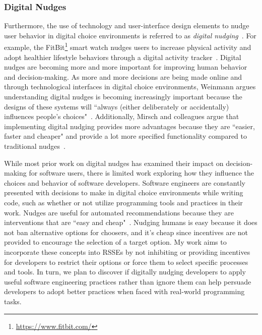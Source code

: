 \subsubsection{Digital Nudges}

Furthermore, the use of technology and user-interface design elements to nudge user behavior in digital choice environments is referred to as \textit{digital nudging}~\cite{weinmann2016digitalnudging}. For example, the FitBit\footnote{\url{https://www.fitbit.com/}} smart watch nudges users to increase physical activity and adopt healthier lifestyle behaviors through a digital activity tracker~\cite{weinmann2016digitalnudging}. Digital nudges are becoming more and more important for improving human behavior and decision-making. As more and more decisions are being made online and through technological interfaces in digital choice environments, Weinmann argues understanding digital nudges is becoming increasingly important because the designs of these systems will ``always (either deliberately or accidentally) influences people's choices"~\cite[p.~433]{weinmann2016digitalnudging}. Additionally, Mirsch and colleagues argue that implementing digital nudging provides more advantages because they are ``easier, faster and cheaper" and provide a lot more specified functionality compared to traditional nudges~\cite[p.~635]{mirsch2017digital}.

While most prior work on digital nudges has examined their impact on decision-making for software users, there is limited work exploring how they influence the choices and behavior of software developers. Software engineers are constantly presented with decisions to make in digital choice environments while writing code, such as whether or not utilize programming tools and practices in their work. Nudges are useful for automated recommendations because they are interventions that are ``easy and cheap"~\cite[p.~6]{sunstein2008nudge}. Nudging humans is easy because it does not ban alternative options for choosers, and it's cheap since incentives are not provided to encourage the selection of a target option. My work aims to incorporate these concepts into RSSEs by not inhibiting or providing incentives for developers to restrict their options or force them to select specific processes and tools. In turn, we plan to discover if digitally nudging developers to apply useful software engineering practices rather than ignore them can help persuade developers to adopt better practices when faced with real-world programming tasks.

